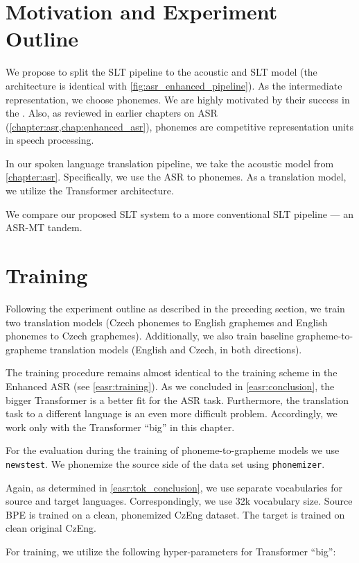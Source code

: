 \section{Motivation and Experiment Outline}
\label{slt:outline}
We propose to split the SLT pipeline to the acoustic and SLT model (the architecture is identical with \cref{fig:asr_enhanced_pipeline}). As the intermediate representation, we choose phonemes. We are highly motivated by their success in the . Also, as reviewed in earlier chapters on ASR (\cref{chapter:asr,chap:enhanced_asr}), phonemes are competitive representation units in speech processing.  

In our spoken language translation pipeline, we take the acoustic model from \cref{chapter:asr}. Specifically, we use the ASR to phonemes. As a translation model, we utilize the Transformer architecture.

We compare our proposed SLT system to a more conventional SLT pipeline --- an ASR-MT tandem.

\section{Training}
\label{slt:training}
Following the experiment outline as described in the preceding section, we train two translation models (Czech phonemes to English graphemes and English phonemes to Czech graphemes). Additionally, we also train baseline grapheme-to-grapheme translation models (English and Czech, in both directions). 

The training procedure remains almost identical to the training scheme in the Enhanced ASR (see \cref{easr:training}). As we concluded in \cref{easr:conclusion}, the bigger Transformer is a better fit for the ASR task. Furthermore, the translation task to a different language is an even more difficult problem. Accordingly, we work only with the Transformer ``big'' in this chapter.

For the evaluation during the training of phoneme-to-grapheme models we use \texttt{news\-test}. We phonemize the source side of the data set using \texttt{phonemizer}.

Again, as determined in \cref{easr:tok_conclusion}, we use separate vocabularies for source and target languages. Correspondingly, we use 32k vocabulary size. Source BPE is trained on a clean, phonemized CzEng dataset. The target is trained on clean original CzEng.

For training, we utilize the following hyper-parameters for Transformer ``big'':\\


